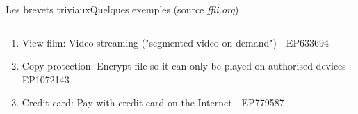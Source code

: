 \documentclass{beamer}
\begin{document}
\begin{frame}{Les brevets triviaux}{Quelques exemples (source \emph{ffii.org})}
\begin{columns}[c]
\begin{column}{.50\linewidth}
\begin{tiny}
\begin{enumerate}
                    \item View film: Video streaming ("segmented video on-demand") - EP633694
                    \item Copy protection: Encrypt file so it can only be played on authorised devices - EP1072143
                    \item Credit card: Pay with credit card on the Internet - EP779587
                \end{enumerate}
            \end{tiny}
        \end{column}
    \end{columns}

\end{frame}
\end{document}
